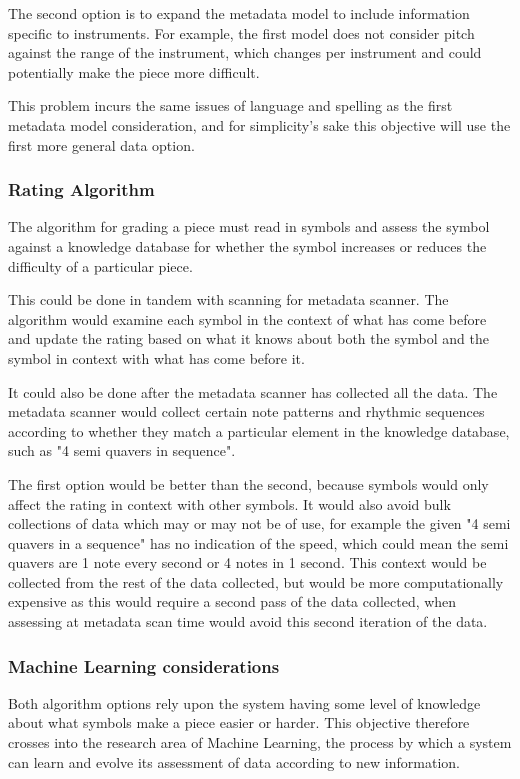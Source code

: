 The second option is to expand the metadata model to include information specific to instruments. For example, the first model does not consider pitch against the range of the instrument, which changes per instrument and could potentially make the piece more difficult. 

This problem incurs the same issues of language and spelling as the first metadata model consideration, and for simplicity's sake this objective will use the first more general data option.

\subsubsection{Rating Algorithm}
The algorithm for grading a piece must read in symbols and assess the symbol against a knowledge database for whether the symbol increases or reduces the difficulty of a particular piece.

This could be done in tandem with scanning for metadata scanner. The algorithm would examine each symbol in the context of what has come before and update the rating based on what it knows about both the symbol and the symbol in context with what has come before it.

It could also be done after the metadata scanner has collected all the data. The metadata scanner would collect certain note patterns and rhythmic sequences according to whether they match a particular element in the knowledge database, such as "4 semi quavers in sequence".

The first option would be better than the second, because symbols would only affect the rating in context with other symbols. It would also avoid bulk collections of data which may or may not be of use, for example the given "4 semi quavers in a sequence" has no indication of the speed, which could mean the semi quavers are 1 note every second or 4 notes in 1 second. This context would be collected from the rest of the data collected, but would be more computationally expensive as this would require a second pass of the data collected, when assessing at metadata scan time would avoid this second iteration of the data.

\subsubsection{Machine Learning considerations}
Both algorithm options rely upon the system having some level of knowledge about what symbols make a piece easier or harder. This objective therefore crosses into the research area of Machine Learning, the process by which a system can learn and evolve its assessment of data according to new information. %

